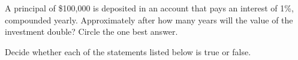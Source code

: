 \documentclass[11pt,answers]{exam}
\let\originalleft\left
\let\originalright\right
\renewcommand{\left}{\mathopen{}\mathclose\bgroup\originalleft}
\renewcommand{\right}{\aftergroup\egroup\originalright}
\begin{document}

\begin{questions}


\addpoints

        

\bonusquestion[1]  A principal of 
\$100,000 is deposited in an account that pays an interest of 1\%, compounded yearly. Approximately after how many years will the value of the investment double? Circle the one best answer.
\begin{oneparchoices}
\end{oneparchoices}
\question Decide whether each of the statements listed below is true or false.
\end{questions}
\end{document}
